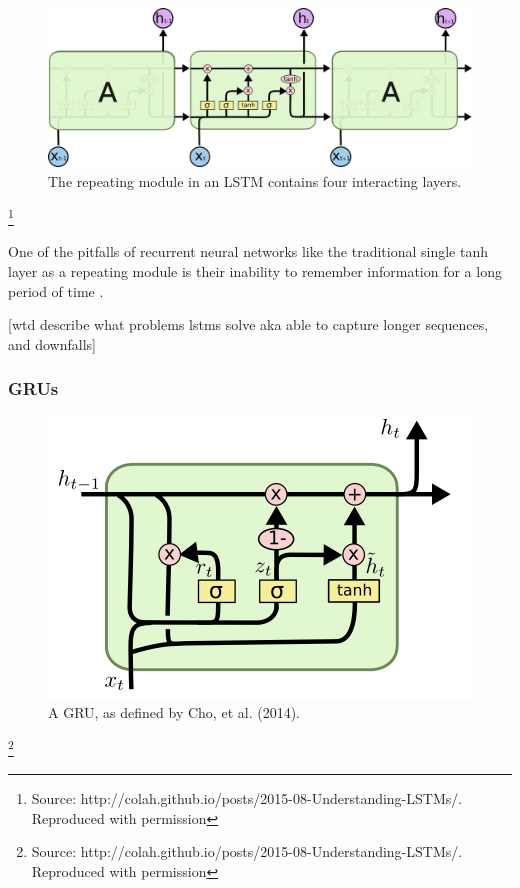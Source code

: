 \begin{figure}[h]
    \centering
	\includegraphics[width=.8\textwidth]{./images/illustrations/LSTM3}
    \caption{The repeating module in an LSTM contains four interacting layers.}
    \label{fig:mesh1}
\end{figure}\footnote{Source: http://colah.github.io/posts/2015-08-Understanding-LSTMs/. Reproduced with permission}



One of the pitfalls of recurrent neural networks like the traditional single tanh layer as a repeating module is their inability to remember information for a long period of time \cite{Hochreiter:1997:LSM:1246443.1246450}.

[wtd describe what problems lstms solve aka able to capture longer sequences, and downfalls]

\subsubsection{GRUs}

\begin{figure}[h]
    \centering
	\includegraphics[width=.8\textwidth]{./images/illustrations/GRU}
    \caption{A GRU, as defined by Cho, et al. (2014).}
    \label{fig:mesh1}
\end{figure}\footnote{Source: http://colah.github.io/posts/2015-08-Understanding-LSTMs/. Reproduced with permission}



